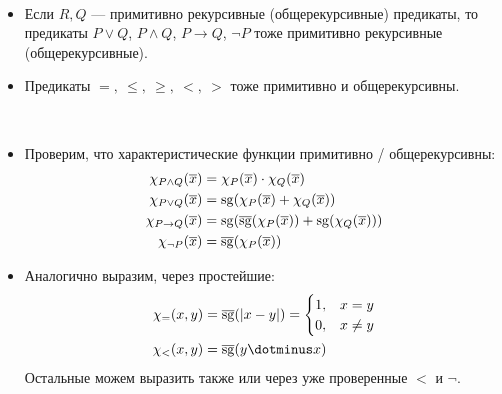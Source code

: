 \begin{st}
	~\begin{itemize}
		\item Если  $ R, Q$ --- примитивно рекурсивные (общерекурсивные) предикаты, то предикаты $ P \vee Q$, $P \wedge Q$, $P \to Q$, $\neg P$ тоже примитивно рекурсивные (общерекурсивные).
		\item Предикаты $ = , ~\le , ~\ge , ~<, ~>$ тоже примитивно и общерекурсивны.
    \end{itemize}
\end{st}
\begin{proof*}
	~\begin{itemize}
		\item Проверим, что характеристические функции примитивно / общерекурсивны: 
			\[
			\begin{aligned}
				\chi_{P \wedge  Q}(\overline{x}) & = \chi_{P}(\overline{x}) \cdot \chi_{Q}(\overline{x}) \\
				\chi_{P \vee Q}(\overline{x}) & = \operatorname{sg}(\chi_{P}(\overline{x}) + \chi_{Q}(\overline{x})) \\
				\chi_{P \to Q}(\overline{x}) &= \operatorname{sg}(\operatorname{\overline{sg}}(\chi_{P}(\overline{x})) + \operatorname{sg}(\chi_{Q}(\overline{x}))) \\
				\chi_{\neg P} (\overline{x}) & = \operatorname{\overline{sg}}(\chi_{P}(\overline{x}))
			\end{aligned}
			\]
		\item Аналогично выразим, через простейшие:  
			\[
			\begin{aligned}
				\chi_{=} (x, y) &= \bsg(\lvert x - y \rvert ) = \begin{cases}
					1, &x=y \\
					0, &x\ne y
				\end{cases} \\
					\chi_{<}(x, y) &= \bsg (y \dotminus x)
			\end{aligned}
			\]
			Остальные можем выразить также или через уже проверенные $ <$ и $ \neg$.
    \end{itemize}
\end{proof*}


